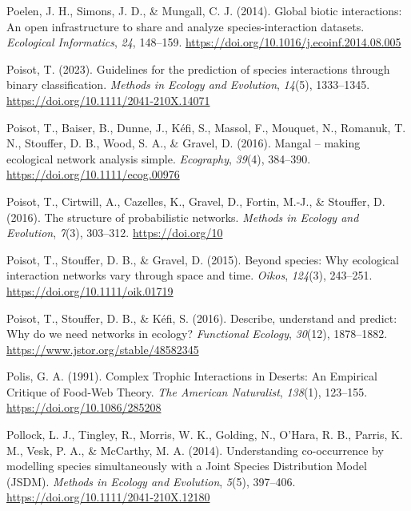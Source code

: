 \documentclass[
]{article}
\newlength{\cslhangindent}
\newenvironment{CSLReferences}[2] %
 {\begin{list}{}{%
  \setlength{\itemindent}{0pt}
  \setlength{\leftmargin}{0pt}
  \setlength{\parsep}{0pt}
  \ifodd #1
   \setlength{\leftmargin}{\cslhangindent}
   \setlength{\itemindent}{-1\cslhangindent}
  \fi
  \setlength{\itemsep}{#2\baselineskip}}}
 {\end{list}}
\begin{document}
\begin{CSLReferences}{1}{0}
Poelen, J. H., Simons, J. D., \& Mungall, C. J. (2014). Global biotic
interactions: {An} open infrastructure to share and analyze
species-interaction datasets. \emph{Ecological Informatics}, \emph{24},
148--159. \url{https://doi.org/10.1016/j.ecoinf.2014.08.005}

Poisot, T. (2023). Guidelines for the prediction of species interactions
through binary classification. \emph{Methods in Ecology and Evolution},
\emph{14}(5), 1333--1345. \url{https://doi.org/10.1111/2041-210X.14071}

Poisot, T., Baiser, B., Dunne, J., Kéfi, S., Massol, F., Mouquet, N.,
Romanuk, T. N., Stouffer, D. B., Wood, S. A., \& Gravel, D. (2016).
Mangal -- making ecological network analysis simple. \emph{Ecography},
\emph{39}(4), 384--390. \url{https://doi.org/10.1111/ecog.00976}

Poisot, T., Cirtwill, A., Cazelles, K., Gravel, D., Fortin, M.-J., \&
Stouffer, D. (2016). The structure of probabilistic networks.
\emph{Methods in Ecology and Evolution}, \emph{7}(3), 303--312.
\url{https://doi.org/10}

Poisot, T., Stouffer, D. B., \& Gravel, D. (2015). Beyond species: Why
ecological interaction networks vary through space and time.
\emph{Oikos}, \emph{124}(3), 243--251.
\url{https://doi.org/10.1111/oik.01719}

Poisot, T., Stouffer, D. B., \& Kéfi, S. (2016). Describe, understand
and predict: Why do we need networks in ecology? \emph{Functional
Ecology}, \emph{30}(12), 1878--1882.
\url{https://www.jstor.org/stable/48582345}

Polis, G. A. (1991). Complex {Trophic Interactions} in {Deserts}: {An
Empirical Critique} of {Food-Web Theory}. \emph{The American
Naturalist}, \emph{138}(1), 123--155.
\url{https://doi.org/10.1086/285208}

Pollock, L. J., Tingley, R., Morris, W. K., Golding, N., O'Hara, R. B.,
Parris, K. M., Vesk, P. A., \& McCarthy, M. A. (2014). Understanding
co-occurrence by modelling species simultaneously with a {Joint Species
Distribution Model} ({JSDM}). \emph{Methods in Ecology and Evolution},
\emph{5}(5), 397--406. \url{https://doi.org/10.1111/2041-210X.12180}


\end{CSLReferences}
\end{document}
